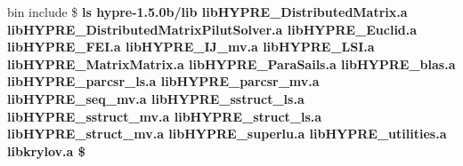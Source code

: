 \begin{ttfamily}
bin                       include\linebreak
\$ \bfseries{ls hypre-1.5.0b/lib}\linebreak
libHYPRE\_DistributedMatrix.a\linebreak
libHYPRE\_DistributedMatrixPilutSolver.a\linebreak
libHYPRE\_Euclid.a\linebreak
libHYPRE\_FEI.a\linebreak
libHYPRE\_IJ_mv.a\linebreak
libHYPRE\_LSI.a\linebreak
libHYPRE\_MatrixMatrix.a\linebreak
libHYPRE\_ParaSails.a\linebreak
libHYPRE\_blas.a\linebreak
libHYPRE\_parcsr\_ls.a\linebreak
libHYPRE\_parcsr\_mv.a\linebreak
libHYPRE\_seq\_mv.a\linebreak
libHYPRE\_sstruct\_ls.a\linebreak
libHYPRE\_sstruct\_mv.a\linebreak
libHYPRE\_struct\_ls.a\linebreak
libHYPRE\_struct\_mv.a\linebreak
libHYPRE\_superlu.a\linebreak
libHYPRE\_utilities.a\linebreak
libkrylov.a\linebreak
\$ \linebreak
\end{ttfamily}

